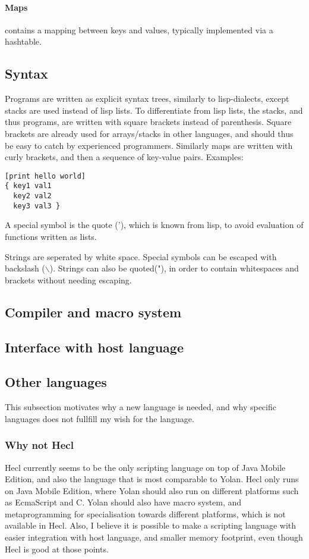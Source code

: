 \paragraph{Maps} contains a mapping between keys and values, typically implemented via a hashtable. 

\subsection{Syntax}

Programs are written as explicit syntax trees, similarly to lisp-dialects, except stacks are used instead of lisp lists.
To differentiate from lisp lists, the stacks, and thus programs, are written with square brackets instead of parenthesis.
Square brackets are already used for arrays/stacks in other languages, and should thus be easy to catch by experienced programmers. 
Similarly maps are written with curly brackets, and then a sequence of key-value pairs. Examples:
\begin{verbatim}
[print hello world]
{ key1 val1  
  key2 val2 
  key3 val3 }
\end{verbatim}

A special symbol is the quote ('), which is known from lisp, to avoid evaluation of functions written as lists.

Strings are seperated by white space. Special symbols can be escaped with backslash ($\backslash$). Strings can also be quoted("), in order to contain whitespaces and brackets without needing escaping.

\subsection{Compiler and macro system}
\subsection{Interface with host language}

\subsection{Other languages}

This subsection motivates why a new language is needed, 
and why specific languages does not fullfill my wish for the language.

\subsubsection{Why not Hecl}
Hecl currently seems to be the only scripting language on top of Java Mobile Edition, and also the language that is most comparable to Yolan.
Hecl only runs on Java Mobile Edition, where Yolan should also run on different platforms such as EcmaScript and C. 
Yolan should also have macro system, and metaprogramming for specialisation towards different platforms, which is not available in Hecl.
Also, I believe it is possible to make a scripting language with easier integration with host language, and smaller memory footprint, even though Hecl is good at those points.

